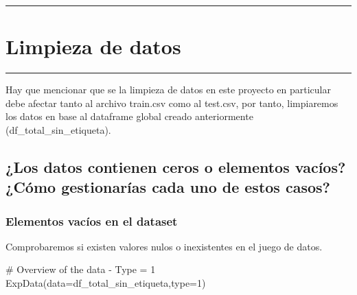 \documentclass[
]{article}
\newenvironment{Shaded}{\begin{snugshade}}{\end{snugshade}}
\newcommand{\CommentTok}[1]{\textcolor[rgb]{0.50,0.62,0.50}{#1}}
\newcommand{\DataTypeTok}[1]{\textcolor[rgb]{0.87,0.87,0.75}{#1}}
\newcommand{\DecValTok}[1]{\textcolor[rgb]{0.86,0.86,0.80}{#1}}
\newcommand{\KeywordTok}[1]{\textcolor[rgb]{0.94,0.87,0.69}{#1}}
\newcommand{\NormalTok}[1]{\textcolor[rgb]{0.80,0.80,0.80}{#1}}
\begin{document}
\begin{center}\rule{0.5\linewidth}{0.5pt}\end{center}

\hypertarget{limpieza-de-datos}{%
\section{\texorpdfstring{\textbf{Limpieza de
datos}}{Limpieza de datos}}\label{limpieza-de-datos}}

\begin{center}\rule{0.5\linewidth}{0.5pt}\end{center}

Hay que mencionar que se la limpieza de datos en este proyecto en
particular debe afectar tanto al archivo train.csv como al test.csv, por
tanto, limpiaremos los datos en base al dataframe global creado
anteriormente (df\_total\_sin\_etiqueta).

\hypertarget{los-datos-contienen-ceros-o-elementos-vacuxedos-cuxf3mo-gestionaruxedas-cada-uno-de-estos-casos}{%
\subsection{\texorpdfstring{\textbf{¿Los datos contienen ceros o
elementos vacíos? ¿Cómo gestionarías cada uno de estos
casos?}}{¿Los datos contienen ceros o elementos vacíos? ¿Cómo gestionarías cada uno de estos casos?}}\label{los-datos-contienen-ceros-o-elementos-vacuxedos-cuxf3mo-gestionaruxedas-cada-uno-de-estos-casos}}

\hypertarget{elementos-vacuxedos-en-el-dataset}{%
\subsubsection{\texorpdfstring{\textbf{Elementos vacíos en el
dataset}}{Elementos vacíos en el dataset}}\label{elementos-vacuxedos-en-el-dataset}}

Comprobaremos si existen valores nulos o inexistentes en el juego de
datos.

\begin{Shaded}
\begin{Highlighting}[]
\CommentTok{# Overview of the data - Type = 1}
\KeywordTok{ExpData}\NormalTok{(}\DataTypeTok{data=}\NormalTok{df_total_sin_etiqueta,}\DataTypeTok{type=}\DecValTok{1}\NormalTok{)}
\end{Highlighting}
\end{Shaded}
\end{document}
